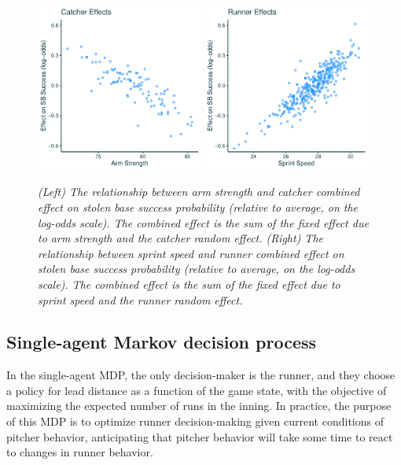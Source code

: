 \documentclass{article}
\begin{document}
      \begin{figure}[H]
        \centering
        \includegraphics[width = 0.49\textwidth]{effect_catcher_light.pdf}
        \includegraphics[width = 0.49\textwidth]{effect_runner_light.pdf}
        \caption{
          \it
          (Left) The relationship between arm strength and catcher combined effect on stolen base success probability (relative to average, on the log-odds scale). The combined effect is the sum of the fixed effect due to arm strength and the catcher random effect.
          (Right) The relationship between sprint speed and runner combined effect on stolen base success probability (relative to average, on the log-odds scale). The combined effect is the sum of the fixed effect due to sprint speed and the runner random effect.
        }
        \label{fig:random-effect}
      \end{figure}

    \subsection{Single-agent Markov decision process}

      In the single-agent MDP, the only decision-maker is the runner, and they choose a policy for lead distance as a function of the game state, with the objective of maximizing the expected number of runs in the inning. In practice, the purpose of this MDP is to optimize runner decision-making given current conditions of pitcher behavior, anticipating that pitcher behavior will take some time to react to changes in runner behavior.
\end{document}
